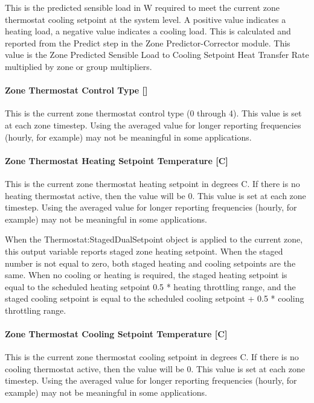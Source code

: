 This is the predicted sensible load in W required to meet the current zone thermostat cooling setpoint at the system level. A positive value indicates a heating load, a negative value indicates a cooling load. This is calculated and reported from the Predict step in the Zone Predictor-Corrector module. This value is the Zone Predicted Sensible Load to Cooling Setpoint Heat Transfer Rate multiplied by zone or group multipliers.

\paragraph{Zone Thermostat Control Type {[]}}\label{zone-thermostat-control-type}

This is the current zone thermostat control type (0 through 4). This value is set at each zone timestep. Using the averaged value for longer reporting frequencies (hourly, for example) may not be meaningful in some applications.

\paragraph{Zone Thermostat Heating Setpoint Temperature {[}C{]}}\label{zone-thermostat-heating-setpoint-temperature-c}

This is the current zone thermostat heating setpoint in degrees C. If there is no heating thermostat active, then the value will be 0. This value is set at each zone timestep. Using the averaged value for longer reporting frequencies (hourly, for example) may not be meaningful in some applications.

When the Thermostat:StagedDualSetpoint object is applied to the current zone, this output variable reports staged zone heating setpoint. When the staged number is not equal to zero, both staged heating and cooling setpoints are the same. When no cooling or heating is required, the staged heating setpoint is equal to the scheduled heating setpoint 0.5 * heating throttling range, and the staged cooling setpoint is equal to the scheduled cooling setpoint + 0.5 * cooling throttling range.

\paragraph{Zone Thermostat Cooling Setpoint Temperature {[}C{]}}\label{zone-thermostat-cooling-setpoint-temperature-c}

This is the current zone thermostat cooling setpoint in degrees C. If there is no cooling thermostat active, then the value will be 0. This value is set at each zone timestep. Using the averaged value for longer reporting frequencies (hourly, for example) may not be meaningful in some applications.

